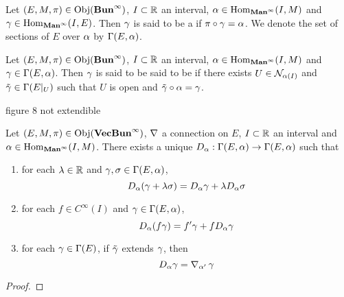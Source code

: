 \documentclass{book}
\begin{document}
	\begin{defn}
	\end{defn}

	\begin{defn}
		Let $(E, M, \pi) \in \operatorname{Obj}(\operatorname*{\text{\textbf{Bun}}^{\infty}})$, $I \subset \mathbb{R}$ an interval, $\alpha \in \operatorname{Hom}_{\operatorname*{\text{\textbf{Man}}^{\infty}}}(I, M)$ and $\gamma \in \operatorname{Hom}_{\operatorname*{\text{\textbf{Man}}^{\infty}}}(I, E)$. Then $\gamma$ is said to be a  if $\pi \circ \gamma = \alpha$. We denote the set of sections of $E$ over $\alpha$ by $\Gamma(E, \alpha)$. 
	\end{defn}

	\begin{defn}
		Let $(E, M, \pi) \in \operatorname{Obj}(\operatorname*{\text{\textbf{Bun}}^{\infty}})$, $I \subset \mathbb{R}$ an interval, $\alpha \in \operatorname{Hom}_{\operatorname*{\text{\textbf{Man}}^{\infty}}}(I, M)$ and $\gamma \in \Gamma(E, \alpha)$. Then $\gamma$ is said to be said to be  if there exists $U \in \mathcal{N}_{\alpha(I)}$ and $\tilde{\gamma} \in \Gamma(E|_U)$ such that $U$ is open and $\tilde{\gamma} \circ \alpha = \gamma $.
	\end{defn}

	\begin{ex}
		figure 8 not extendible
	\end{ex}

	\begin{ex}
		Let $(E, M, \pi) \in \operatorname{Obj}(\operatorname*{\text{\textbf{VecBun}}^{\infty}})$, $\operatorname{\nabla}$ a connection on $E$, $I \subset \mathbb{R}$ an interval and $\alpha \in \operatorname{Hom}_{\operatorname*{\text{\textbf{Man}}^{\infty}}}(I, M)$. There exists a unique $D_{\alpha}: \Gamma(E, \alpha) \rightarrow \Gamma(E, \alpha)$ such that 
		\begin{enumerate}
			\item for each $\lambda \in \mathbb{R}$ and $\gamma, \sigma \in \Gamma(E, \alpha)$, 
			$$D_{\alpha}(\gamma + \lambda \sigma) = D_{\alpha} \gamma + \lambda D_{\alpha} \sigma $$
			\item for each $f \in C^{\infty}(I)$ and $\gamma \in \Gamma(E, \alpha)$, 
			$$D_{\alpha}(f \gamma) = f' \gamma + f D_{\alpha} \gamma $$
			\item for each $\gamma \in \Gamma(E)$, if $\tilde{\gamma}$ extends $\gamma$, then 
			$$D_{\alpha} \gamma = \operatorname{\nabla}_{\alpha'} \gamma$$
		\end{enumerate}
	\end{ex}

	\begin{proof}
		
	\end{proof}
	
\end{document}
